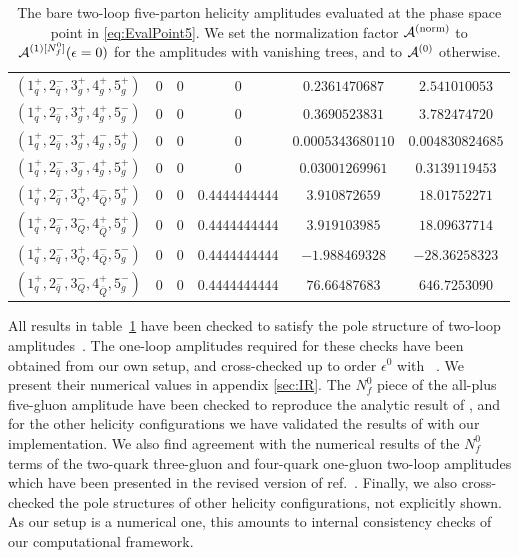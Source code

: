 \begin{table}[!htbp]
\begin{adjustbox}{width=1\textwidth}
\begin{tabular}{cccccc}
      \midrule
      $( 1_q^+, 2_{\bar q}^-, 3_g^+, 4_g^+, 5_g^+ )$ & 0 & 0 & 0 & $0.2361470687$ & $2.541010053$ \\
      $( 1_q^+, 2_{\bar q}^-, 3_g^+, 4_g^+, 5_g^- )$ & 0 & 0 & 0 & $0.3690523831$ & $3.782474720$ \\
      $( 1_q^+, 2_{\bar q}^-, 3_g^+, 4_g^-, 5_g^+ )$ & 0 & 0 & 0 & $0.0005343680110$ & $0.004830824685$ \\
      $( 1_q^+, 2_{\bar q}^-, 3_g^-, 4_g^+, 5_g^+ )$ & 0 & 0 & 0 & $0.03001269961$ & $0.3139119453$ \\
      \midrule
      $( 1_q^+, 2_{\bar q}^-, 3_Q^+, 4_{\bar Q}^-, 5_g^+ )$ & 0 & 0 & $0.4444444444$ & $3.910872659$ & $18.01752271$ \\
      $( 1_q^+, 2_{\bar q}^-, 3_Q^-, 4_{\bar Q}^+, 5_g^+ )$ & 0 & 0 & $0.4444444444$ & $3.919103985$ & $18.09637714$ \\
      $( 1_q^+, 2_{\bar q}^-, 3_Q^+, 4_{\bar Q}^-, 5_g^- )$ & 0 & 0 & $0.4444444444$ & $-1.988469328$ & $-28.36258323$ \\
      $( 1_q^+, 2_{\bar q}^-, 3_Q^-, 4_{\bar Q}^+, 5_g^- )$ & 0 & 0 & $0.4444444444$ & $76.66487683$ & $646.7253090$ \\
      \bottomrule
    \end{tabular}
  \end{adjustbox}
  \caption{The bare two-loop five-parton helicity amplitudes evaluated
    at the phase space point in \cref{eq:EvalPoint5}. We set the
    normalization factor $\mathcal{A}^\mathrm{(norm)}$ to $\mathcal{A}^{(1)[N_f^0]}(\epsilon=0)$ for the
    amplitudes with vanishing trees, and to $\mathcal{A}^{(0)}$ otherwise.} 
  \label{tab:results5parton}
\end{table}

All results in table~\ref{tab:results5parton} have been 
checked to satisfy the pole structure of two-loop
amplitudes~\cite{Catani:1998bh}. 
The one-loop amplitudes required for these checks
have been obtained from our own setup,
and cross-checked up to order $\epsilon^0$ 
with \BlackHat{}~\cite{Berger:2008sj}. We present their 
numerical values in appendix \ref{sec:IR}.
The $N_f^0$ piece of the all-plus five-gluon amplitude have been
checked to reproduce the analytic result
of \cite{Gehrmann:2015bfy}, and for the other helicity 
configurations we have validated the results of
\cite{Badger:2017jhb} with our implementation.
We also find agreement with the numerical results of the $N_f^0$ terms
of the two-quark three-gluon and four-quark one-gluon two-loop
amplitudes which have been presented in the revised version of
ref.~\cite{Badger:2018gip}.
Finally, we also cross-checked the pole structures of other 
helicity configurations, not explicitly shown. As our setup is a
numerical one, this amounts to internal consistency checks of 
our computational framework.


